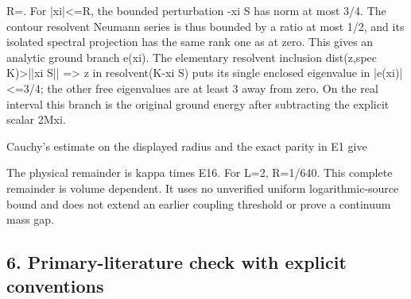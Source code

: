 \documentclass[11pt,a4paper]{article}
\renewcommand{\[}{\begingroup\small\originaldisplaystart}
\renewcommand{\]}{\originaldisplayend\endgroup}
\begin{document}
\[
 R=.
\] For
{\ttfamily |\allowbreak{}x\allowbreak{}i\allowbreak{}|\allowbreak{}\textless{}\allowbreak{}=\allowbreak{}R\allowbreak{}},
the bounded perturbation
{\ttfamily -\allowbreak{}x\allowbreak{}i\allowbreak{} \allowbreak{}S\allowbreak{}}
has norm at most 3/4. The contour resolvent Neumann series is thus
bounded by a ratio at most 1/2, and its isolated spectral projection has
the same rank one as at zero. This gives an analytic ground branch
e(xi). The elementary resolvent inclusion
{\ttfamily d\allowbreak{}i\allowbreak{}s\allowbreak{}t\allowbreak{}(\allowbreak{}z\allowbreak{},\allowbreak{}s\allowbreak{}p\allowbreak{}e\allowbreak{}c\allowbreak{} \allowbreak{}K\allowbreak{})\allowbreak{}\textgreater{}\allowbreak{}|\allowbreak{}|\allowbreak{}x\allowbreak{}i\allowbreak{} \allowbreak{}S\allowbreak{}|\allowbreak{}|\allowbreak{} \allowbreak{}=\allowbreak{}\textgreater{}\allowbreak{} \allowbreak{}z\allowbreak{} \allowbreak{}i\allowbreak{}n\allowbreak{} \allowbreak{}r\allowbreak{}e\allowbreak{}s\allowbreak{}o\allowbreak{}l\allowbreak{}v\allowbreak{}e\allowbreak{}n\allowbreak{}t\allowbreak{}(\allowbreak{}K\allowbreak{}-\allowbreak{}x\allowbreak{}i\allowbreak{} \allowbreak{}S\allowbreak{})\allowbreak{}}
puts its single enclosed eigenvalue in
{\ttfamily |\allowbreak{}e\allowbreak{}(\allowbreak{}x\allowbreak{}i\allowbreak{})\allowbreak{}|\allowbreak{}\textless{}\allowbreak{}=\allowbreak{}3\allowbreak{}/\allowbreak{}4\allowbreak{}};
the other free eigenvalues are at least 3 away from zero. On the real
interval this branch is the original ground energy after subtracting the
explicit scalar 2Mxi.

Cauchy's estimate on the displayed radius and the exact parity in E1
give

\[
\] The physical remainder is kappa times E16. For L=2,
{\ttfamily R\allowbreak{}=\allowbreak{}1\allowbreak{}/\allowbreak{}6\allowbreak{}4\allowbreak{}0\allowbreak{}}.
This complete remainder is volume dependent. It uses no unverified
uniform logarithmic-source bound and does not extend an earlier coupling
threshold or prove a continuum mass gap.

\subsection{6. Primary-literature check with explicit
conventions}\label{primary-literature-check-with-explicit-conventions}
\end{document}
